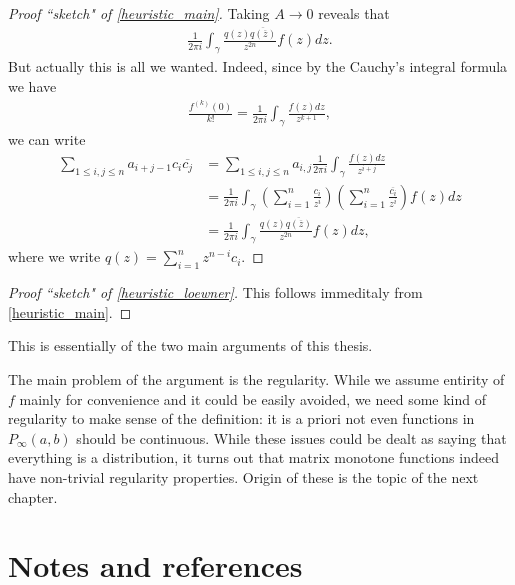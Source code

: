 \begin{proof}[Proof ``sketch" of \ref{heuristic_main}]
	Taking $A \to 0$ reveals that
	\begin{align*}
		\frac{1}{2 \pi i}\int_{\gamma} \frac{q(z) \overline{q(\overline{z})}}{z^{2 n}} f(z) dz.
	\end{align*}
	But actually this is all we wanted. Indeed, since by the Cauchy's integral formula we have
	\begin{align*}
		\frac{f^{(k)}(0)}{k!} = \frac{1}{2 \pi i} \int_{\gamma} \frac{f(z) d z}{z^{k + 1}},
	\end{align*}
	we can write
	\begin{align*}
		\sum_{1 \leq i, j \leq n} a_{i + j - 1} c_{i} \overline{c_{j}} &= \sum_{1 \leq i, j \leq n} a_{i, j} \frac{1}{2 \pi i} \int_{\gamma} \frac{f(z) d z}{z^{i + j}} \\
		&= \frac{1}{2 \pi i} \int_{\gamma} \left(\sum_{i = 1}^{n} \frac{c_{i}}{z^{i}} \right) \left(\sum_{i = 1}^{n} \frac{\overline{c_{i}}}{z^{i}} \right)f(z) dz \\
		&= \frac{1}{2 \pi i} \int_{\gamma}  \frac{q(z) \overline{q(\overline{z})}}{z^{2 n}} f(z) dz,
	\end{align*}
	where we write $q(z) = \sum_{i = 1}^{n} z^{n - i} c_{i}$.
\end{proof}

\begin{proof}[Proof ``sketch" of \ref{heuristic_loewner}]
	This follows immeditaly from \ref{heuristic_main}.
\end{proof}

This is essentially of the two main arguments of this thesis.

The main problem of the argument is the regularity. While we assume entirity of $f$ mainly for convenience and it could be easily avoided, we need some kind of regularity to make sense of the definition: it is a priori not even functions in $P_{\infty}(a, b)$ should be continuous. While these issues could be dealt as saying that everything is a distribution, it turns out that matrix monotone functions indeed have non-trivial regularity properties. Origin of these is the topic of the next chapter.


\section{Notes and references}
